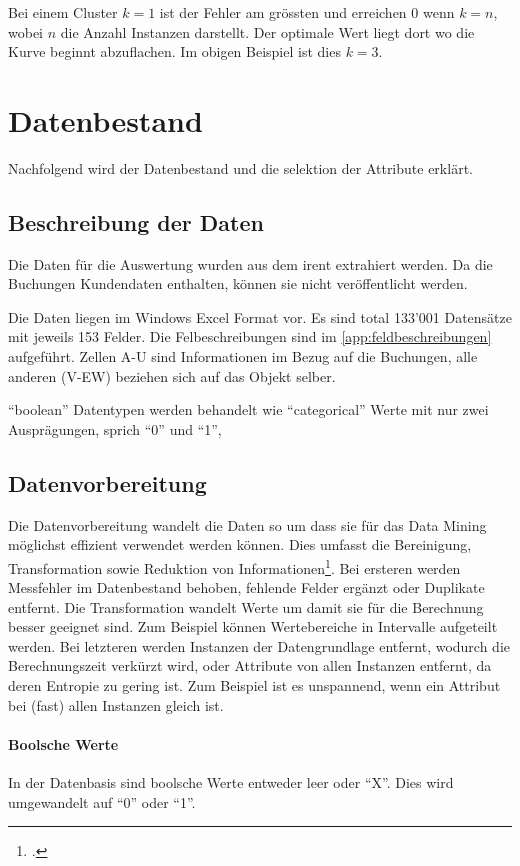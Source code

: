 Bei einem Cluster $k=1$ ist der Fehler am grössten und erreichen 0 wenn $k=n$, wobei $n$ die Anzahl Instanzen darstellt. Der optimale Wert liegt dort wo die Kurve beginnt abzuflachen. Im obigen Beispiel ist dies $k=3$.

\section{Datenbestand}
\label{sec:recherche:datenbestand}
Nachfolgend wird der Datenbestand und die selektion der Attribute erklärt.

\subsection{Beschreibung der Daten}
\label{sec:recherche:datenbeschaffung}
Die Daten für die Auswertung wurden aus dem \gls{irent} extrahiert werden. Da die Buchungen Kundendaten enthalten, können sie nicht veröffentlicht werden.

Die Daten liegen im Windows Excel Format vor. Es sind total 133'001 Datensätze mit jeweils 153 Felder. Die Felbeschreibungen sind im \cref{app:feldbeschreibungen} aufgeführt. Zellen A-U sind Informationen im Bezug auf die Buchungen, alle anderen (V-EW) beziehen sich auf das Objekt selber.

"`boolean"' Datentypen werden behandelt wie "`categorical"' Werte mit nur zwei Ausprägungen, sprich "`0"' und "`1"',

\subsection{Datenvorbereitung}
\label{sec:recherche:datenvorbereitung}
Die Datenvorbereitung wandelt die Daten so um dass sie für das Data Mining möglichst effizient verwendet werden können. Dies umfasst die Bereinigung, Transformation sowie Reduktion von Informationen\footcite{feature_selection_2017-01-04}. Bei ersteren werden Messfehler im Datenbestand behoben, fehlende Felder ergänzt oder Duplikate entfernt. Die Transformation wandelt Werte um damit sie für die Berechnung besser geeignet sind. Zum Beispiel können Wertebereiche in Intervalle aufgeteilt werden. Bei letzteren werden Instanzen der Datengrundlage entfernt, wodurch die Berechnungszeit verkürzt wird, oder Attribute von allen Instanzen entfernt, da deren Entropie zu gering ist. Zum Beispiel ist es unspannend, wenn ein Attribut bei (fast) allen Instanzen gleich ist. 

\paragraph{Boolsche Werte} In der Datenbasis sind boolsche Werte entweder leer oder "`X"'. Dies wird umgewandelt auf "`0"' oder "`1"'.

